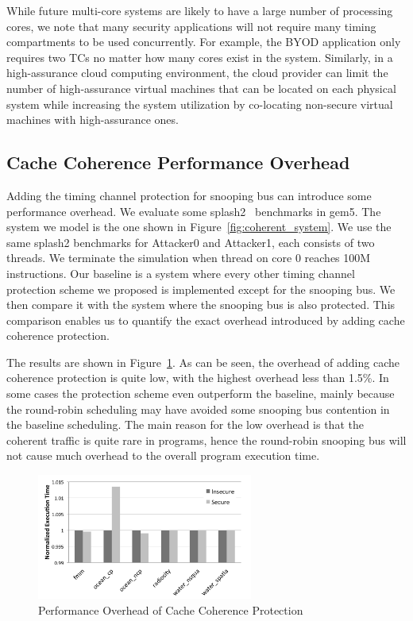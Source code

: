 While future multi-core systems are likely to have a large number of processing 
cores, we note that many security applications will not require many timing 
compartments to be used concurrently. For example, the BYOD application only 
requires two TCs no matter how many cores exist in the system. Similarly, in 
a high-assurance cloud computing environment, the cloud provider can limit the
number of high-assurance virtual machines that can be located on each physical
system while increasing the system utilization by co-locating non-secure
virtual machines with high-assurance ones.

\subsection{Cache Coherence Performance Overhead}
Adding the timing channel protection for snooping bus can introduce some performance overhead. We evaluate some 
splash2~\cite{splash2} benchmarks in gem5. The system we model is the one shown in Figure~\ref{fig:coherent_system}.
We use the same splash2 benchmarks for Attacker0 and Attacker1, each consists of two threads. We terminate the simulation
when thread on core 0 reaches 100M instructions. 
Our baseline is a system where every other timing channel protection scheme we proposed is implemented except for the snooping bus.
We then compare it with the system where the snooping bus is also protected. This comparison enables us to quantify the exact overhead introduced by adding cache coherence protection. 

The results are shown in Figure~\ref{fig:splash2}. As can be seen, the overhead of adding cache coherence protection is
quite low, with the highest overhead less than 1.5\%. In some cases the protection scheme even outperform the baseline, 
mainly because the round-robin scheduling may have avoided some snooping bus contention in the baseline scheduling. 
The main reason for the low overhead is that the coherent traffic is quite rare in programs, hence the round-robin
snooping bus will not cause much overhead to the overall program execution time.

\begin{figure}
    \begin{center}
        \includegraphics[width=2.79in]{figs/splash2.pdf}
        \caption{Performance Overhead of Cache Coherence Protection}
        \label{fig:splash2}
    \end{center}
\end{figure}
